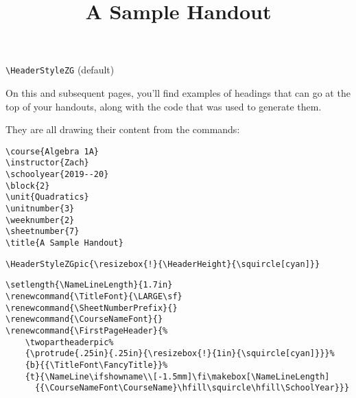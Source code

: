 \documentclass[12pt,twoside,parskip,notitle,showframe]{handout}
\title{A Sample Handout}
\begin{document}
\begingroup
\HeaderStyleZG
\maketitle
\verb|\HeaderStyleZG| (default)
\endgroup

\vfill
On this and subsequent pages, you'll find examples of headings that can go at the top of your handouts, along with the code that was used to generate them.

They are all drawing their content from the commands:
\begingroup
\singlespacing
\begin{verbatim}
\course{Algebra 1A}
\instructor{Zach}
\schoolyear{2019--20}
\block{2}
\unit{Quadratics}
\unitnumber{3}
\weeknumber{2}
\sheetnumber{7}
\title{A Sample Handout}
\end{verbatim}
\endgroup

\newpage

\begingroup
\HeaderStyleZGpic{\resizebox{!}{\HeaderHeight}{\squircle[cyan]}}
\maketitle
\verb|\HeaderStyleZGpic{\resizebox{!}{\HeaderHeight}{\squircle[cyan]}}|
\endgroup

\newpage

\begingroup
\setlength{\NameLineLength}{1.7in}
\renewcommand{\TitleFont}{\LARGE\sf}
\renewcommand{\SheetNumberPrefix}{}
\renewcommand{\CourseNameFont}{}
\renewcommand{\FirstPageHeader}{%
	\twopartheaderpic%
	{\protrude{.25in}{.25in}{\resizebox{!}{1in}{\squircle[cyan]}}}%
	{b}{{\TitleFont\FancyTitle}}%
	{t}{\NameLine\ifshowname\\[-1.5mm]\fi\makebox[\NameLineLength]{{\CourseNameFont\CourseName}\hfill\squircle\hfill\SchoolYear}}}
\maketitle
\singlespacing
\begin{verbatim}
\setlength{\NameLineLength}{1.7in}
\renewcommand{\TitleFont}{\LARGE\sf}
\renewcommand{\SheetNumberPrefix}{}
\renewcommand{\CourseNameFont}{}
\renewcommand{\FirstPageHeader}{%
    \twopartheaderpic%
    {\protrude{.25in}{.25in}{\resizebox{!}{1in}{\squircle[cyan]}}}%
    {b}{{\TitleFont\FancyTitle}}%
    {t}{\NameLine\ifshowname\\[-1.5mm]\fi\makebox[\NameLineLength]
      {{\CourseNameFont\CourseName}\hfill\squircle\hfill\SchoolYear}}}
\end{verbatim}
\endgroup
\end{document}
